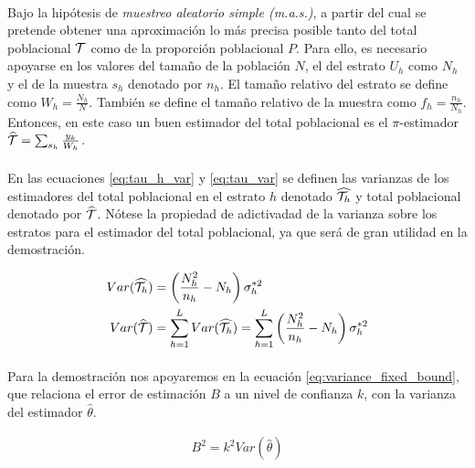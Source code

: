 \documentclass{article}
\begin{document}
    \paragraph{}
    Bajo la hipótesis de \emph{muestreo aleatorio simple (m.a.s.)}, a partir del cual se pretende obtener una aproximación lo más precisa posible tanto del total poblacional $\mathcal{T}$ como de la proporción poblacional $P$. Para ello, es necesario apoyarse en los valores del tamaño de la población $N$, el del estrato $U_h$ como $N_h$ y el de la muestra $s_h$ denotado por $n_h$. El tamaño relativo del estrato se define como $W_h = \frac{N_h}{N}$. También se define el tamaño relativo de la muestra como $f_h = \frac{n_h}{N_h}$. Entonces, en este caso un buen estimador del total poblacional es el $\pi$-estimador $\widehat{\mathcal{T}} = \sum_{s_h} \frac{y_k}{W_h}$.

    \paragraph{}
    En las ecuaciones \eqref{eq:tau_h_var} y \eqref{eq:tau_var} se definen las varianzas de los estimadores del total poblacional en el estrato $h$ denotado $\widehat{\mathcal{T}_h}$ y total poblacional denotado por $\widehat{\mathcal{T}}$. Nótese la propiedad de adictivadad de la varianza sobre los estratos para el estimador del total poblacional, ya que será de gran utilidad en la demostración.

    \begin{align}
    \label{eq:tau_h_var}
      Var(\widehat{\mathcal{T}_h}) &=\left(\frac{N_h^2}{n_h}- N_h\right)\sigma_h^{*2} \\
    \label{eq:tau_var}
      Var(\widehat{\mathcal{T}}) &= \sum\limits_{h=1}^L Var(\widehat{\mathcal{T}_h})=  \sum\limits_{h=1}^L\left(\frac{N_h^2}{n_h}- N_h\right)\sigma_h^{*2}
    \end{align}

    \paragraph{}
    Para la demostración nos apoyaremos en la ecuación \eqref{eq:variance_fixed_bound}, que relaciona el error de estimación $B$ a un nivel de confianza $k$, con la varianza del estimador $\widehat{\theta}$.

    \begin{align}
    \label{eq:variance_fixed_bound}
      B^2 = k^2Var(\widehat{\theta})
    \end{align}
\end{document}
